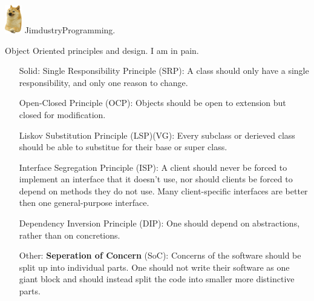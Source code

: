 \documentclass{article}
\begin{document}
\includegraphics[width=2em]{2ljhyisqtna51.png}\newline
{\small Jimdustry\newline Programming.}
\begin{center}
    \vspace*{\fill}
    {\Huge Object Oriented principles and design.}\newline
    {\small I am in pain.}
    \vspace*{\fill}
\end{center}
\newpage

\begin{enumerate}
    \item[\huge{Solid:}]
          {\huge S}ingle Responsibility Principle (SRP):\newline
          A class should only have a single responsibility, and only one reason to change.

              {\huge O}pen-Closed Principle (OCP):\newline
          Objects should be open to extension but closed for modification.

              {\huge L}iskov Substitution Principle (LSP)(VG):\newline
          Every subclass or derieved class should be able to substitue
          for their base or super class.

              {\huge I}nterface Segregation Principle (ISP):\newline
          A client should never be forced to implement an interface that it doesn't use, nor
          should clients be forced to depend on methods they do not use. Many
          client-specific interfaces are better then one general-purpose interface.

              {\huge D}ependency Inversion Principle (DIP):\newline
          One should depend on abstractions, rather than on concretions.

    \item[\huge Other:]
          \textbf{Seperation of Concern} (SoC):\newline
          Concerns of the software should be split up into individual parts.
          One should not write their software as one giant block and should instead
          split the code into smaller more distinctive parts.


\end{enumerate}
\end{document}
